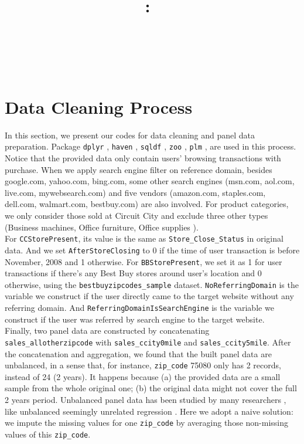 \documentclass{article}
\title{
    \vspace{2in}
    \textmd{\textbf{\hmwkClasstwo:\ \\ \hmwkTitle}}\\
    \vspace{1in}\large{\textit{\hmwkClassInstructor}}
    \vspace{2in}
}
\author{\hmwkAuthorName
\  \\ \hmwkID
\vspace{0.3in}}
\date{}
\begin{document}
\maketitle

\pagebreak

\tableofcontents
\pagebreak
\listoffigures
\pagebreak
\listoftables
\pagebreak
\lstlistoflistings 
\pagebreak

\section{Data Cleaning Process}
In this section, we present our codes for data cleaning and panel data preparation. Package \texttt{dplyr} \cite{wickham2015dplyr}, \texttt{haven} \cite{wickham2018haven}, \texttt{sqldf} \cite{grothendieck2017sqldf}, \texttt{zoo} \cite{zeileis2005zoo}, \texttt{plm} \cite{croissant2008panel}, are used in this process. \\
Notice that the provided data only contain users' browsing transactions with purchase. When we apply search engine filter on reference domain, besides google.com, yahoo.com, bing.com, some other search engines (msn.com, aol.com, live.com, mywebsearch.com) and five vendors (amazon.com, staples.com, dell.com, walmart.com, bestbuy.com) are also involved. For product categories, we only consider those sold at Circuit City and exclude three other types (Business machines, Office furniture, Office supplies
).\\
For \texttt{CCStorePresent}, its value is the same as \texttt{Store\_Close\_Status} in original data. And we set \texttt{AfterStoreClosing} to 0 if the time of user transaction is before November, 2008 and 1 otherwise. For \texttt{BBStorePresent}, we set it as 1 for user transactions if there's any Best Buy stores around user's location and 0 otherwise, using the \texttt{bestbuyzipcodes\_sample} dataset. \texttt{NoReferringDomain} is the variable we construct if the user directly came to the target website without any referring domain. And \texttt{ReferringDomainIsSearchEngine} is the variable we construct if the user was referred by search engine to the target website.\\
Finally, two panel data are constructed by concatenating \texttt{sales\_allotherzipcode} with \texttt{sales\_ccity0mile} and \texttt{sales\_ccity5mile}. After the concatenation and aggregation, we found that the built panel data are unbalanced, in a sense that, for instance, \texttt{zip\_code} 75080 only has 2 records, instead of 24 (2 years). It happens because (a) the provided data are a small sample from the whole original one; (b) the original data might not cover the full 2 years period. Unbalanced panel data has been studied by many researchers \cite{baltagi2006unbalanced}, like unbalanced seemingly unrelated regression \cite{mcdowell2004help}. Here we adopt a naive solution: we impute the missing values for one \texttt{zip\_code} by averaging those non-missing values of this \texttt{zip\_code}.
\end{document}
